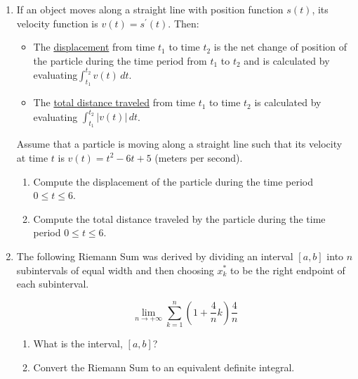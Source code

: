 \documentclass[12pt]{article}
\newif\ifans
\begin{document}
\begin{enumerate}
\item {} If an object moves along a straight line with position function $s(t)$, its velocity function is $v(t)=s^{\prime}(t)$.  Then:

\begin{itemize}

\item The \underline{displacement} from time $t_1$ to time $t_2$ is the net change of position of the particle during the time period from $t_1$ to $t_2$ and is calculated by evaluating$\int_{t_1}^{t_2} v(t) \,dt$.

\item The \underline{total distance traveled} from time $t_1$ to time $t_2$ is calculated by evaluating $\int_{t_1}^{t_2} |v(t)| \,dt$.

\end{itemize}

Assume that a particle is moving along a straight line such that its velocity at time $t$ is $v(t)=t^2-6t+5$  (meters per second).  
\begin{enumerate}

\item Compute the displacement of the particle during the time period $0 \leq t \leq 6$.

\ifans{\fbox{$-6$ meters}} \fi

\item Compute the total distance traveled by the particle during the time period $0 \leq t \leq 6$.

\ifans{\fbox{$\frac{46}{3}$ meters}} \fi

\end{enumerate}

\item The following Riemann Sum was derived by dividing an interval $[a,b]$ into $n$ subintervals of equal width and then choosing $x_k^*$ to be the right endpoint of each subinterval.

$$\lim_{n \rightarrow +\infty} \sum_{k=1}^n{\left(1+\frac{4}{n}k\right)\frac{4}{n}}$$

\begin{enumerate}

\item What is the interval, $[a,b]$?

\ifans{\fbox{If we consider $f(x)=x$, then the interval is $[1,5]$}} \fi

\item Convert the Riemann Sum to an equivalent definite integral.


\end{enumerate}
\end{enumerate}
\end{document}
